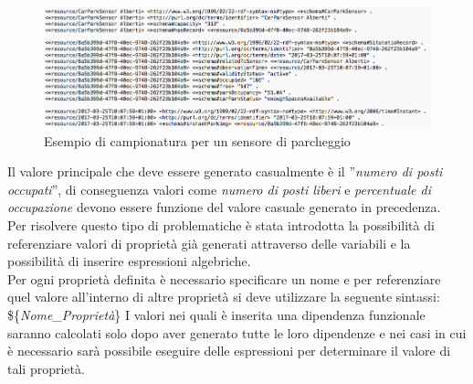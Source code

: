 \documentclass[12pt,a4paper,italian]{article}
\begin{document}
\begin{figure}[h!]
	\centering
	\includegraphics[width=14cm]{img/carParkSensor.png}
	\caption{Esempio di campionatura per un sensore di parcheggio}\label{carparksensor}
\end{figure}

Il valore principale che deve essere generato casualmente è il  ''\emph{numero di posti occupati}'', di conseguenza valori come \emph{numero di posti liberi} e \emph{percentuale di occupazione} devono essere funzione del valore casuale generato in precedenza.\\
Per risolvere questo tipo di problematiche è stata introdotta la possibilità di referenziare valori di proprietà già generati attraverso delle variabili e la possibilità di 
inserire espressioni algebriche.\\
Per ogni proprietà definita è necessario specificare un nome e per referenziare quel valore all'interno di altre proprietà si deve utilizzare la seguente sintassi: \$\{\emph{Nome\_Proprietà}\}
I valori nei quali è inserita una dipendenza funzionale saranno calcolati solo dopo aver generato tutte le loro dipendenze e nei casi in cui è necessario sarà possibile eseguire delle espressioni per determinare il valore di tali proprietà.
\newpage
\end{document}
